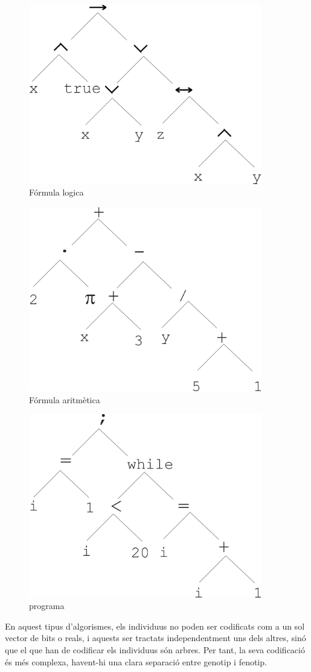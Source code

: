 \documentclass[titlepage,a4paper,12pt]{book}
\begin{document}
\begin{figure} \centering \includegraphics[width=4in]{intro/6-2-2.jpg}
\caption{\label{fig:6-2-2}Fórmula logica}
\end{figure}

\begin{figure} \centering \includegraphics[width=4in]{intro/6-2-1.jpg}
\caption{\label{fig:6-2-1}Fórmula aritmètica}
\end{figure}

\begin{figure} \centering \includegraphics[width=4in]{intro/6-3.jpg}
\caption{\label{fig:6-3}programa}
\end{figure}
En aquest tipus d'algorismes, els individuus no poden ser codificats com a un
sol vector de bits o reals, i aquests ser tractats independentment uns dels
altres, sinó que el que han de codificar els individuus són arbres.  Per tant,
la seva codificació és més complexa, havent-hi una clara separació entre genotip
i fenotip.
\end{document}
